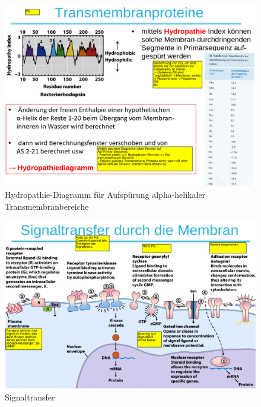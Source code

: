 \documentclass[a4paper,twocolumn,english,fontsize=7,DIV=16]{scrartcl}
\begin{document}
\begin{figure}
	\centering
	\includegraphics[width=\linewidth]{img/hydropathie.png}
	\caption{Hydropathie-Diagramm für Aufspürung alpha-helikaler Transmembranbereiche}
\end{figure}

\begin{figure}
	\centering
	\includegraphics[width=\linewidth]{img/signaltransfer.png}
	\caption{Signaltransfer}
\end{figure}
\end{document}
